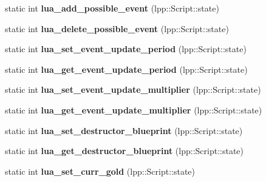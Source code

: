 \begin{DoxyCompactItemize}
\item 
static int {\bfseries lua\+\_\+add\+\_\+possible\+\_\+event} (lpp\+::\+Script\+::state)\hypertarget{class_lua_interface_a2eafd8fba78387e52b9fccae33a15ea9}{}\label{class_lua_interface_a2eafd8fba78387e52b9fccae33a15ea9}

\item 
static int {\bfseries lua\+\_\+delete\+\_\+possible\+\_\+event} (lpp\+::\+Script\+::state)\hypertarget{class_lua_interface_a036a39d5ba92aa1b081837333e94757a}{}\label{class_lua_interface_a036a39d5ba92aa1b081837333e94757a}

\item 
static int {\bfseries lua\+\_\+set\+\_\+event\+\_\+update\+\_\+period} (lpp\+::\+Script\+::state)\hypertarget{class_lua_interface_a101cbb65d5b565d7ccc9582f75b5378b}{}\label{class_lua_interface_a101cbb65d5b565d7ccc9582f75b5378b}

\item 
static int {\bfseries lua\+\_\+get\+\_\+event\+\_\+update\+\_\+period} (lpp\+::\+Script\+::state)\hypertarget{class_lua_interface_afe37dd0c710c25892c2fb9a21b7276d3}{}\label{class_lua_interface_afe37dd0c710c25892c2fb9a21b7276d3}

\item 
static int {\bfseries lua\+\_\+set\+\_\+event\+\_\+update\+\_\+multiplier} (lpp\+::\+Script\+::state)\hypertarget{class_lua_interface_abdb58fb58b5ee0432149e73ff61854d2}{}\label{class_lua_interface_abdb58fb58b5ee0432149e73ff61854d2}

\item 
static int {\bfseries lua\+\_\+get\+\_\+event\+\_\+update\+\_\+multiplier} (lpp\+::\+Script\+::state)\hypertarget{class_lua_interface_ac029e97a3397f6577d5202f1781f24b4}{}\label{class_lua_interface_ac029e97a3397f6577d5202f1781f24b4}

\item 
static int {\bfseries lua\+\_\+set\+\_\+destructor\+\_\+blueprint} (lpp\+::\+Script\+::state)\hypertarget{class_lua_interface_aa2acbc1710028efc5ac4595cea797b47}{}\label{class_lua_interface_aa2acbc1710028efc5ac4595cea797b47}

\item 
static int {\bfseries lua\+\_\+get\+\_\+destructor\+\_\+blueprint} (lpp\+::\+Script\+::state)\hypertarget{class_lua_interface_a8321bad41f3f6eb51031381ce3e704ef}{}\label{class_lua_interface_a8321bad41f3f6eb51031381ce3e704ef}

\item 
static int {\bfseries lua\+\_\+set\+\_\+curr\+\_\+gold} (lpp\+::\+Script\+::state)\hypertarget{class_lua_interface_ad071c198052431ccac3d1d01502eb650}{}\label{class_lua_interface_ad071c198052431ccac3d1d01502eb650}


\end{DoxyCompactItemize}
